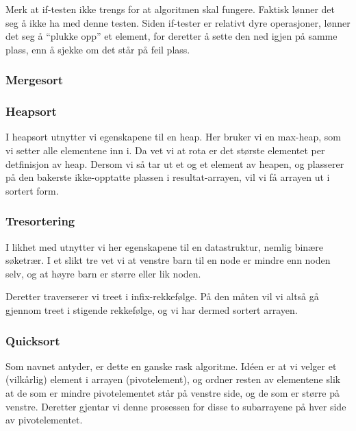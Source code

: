 Merk at if-testen ikke trengs for at algoritmen skal fungere.
Faktisk lønner det seg å ikke ha med denne testen.
Siden if-tester er relativt dyre operasjoner, lønner det seg å ``plukke opp'' et
element, for deretter å sette den ned igjen på samme plass, enn å sjekke om det
står på feil plass.


\subsubsection{\color{red}Mergesort}\label{mergesort}

\subsubsection{\color{red}Heapsort}\label{heapsort}
I heapsort utnytter vi egenskapene til en heap.
Her bruker vi en max-heap, som vi setter alle elementene inn i. Da vet vi at
rota er det største elementet per detfinisjon av heap. Dersom vi så tar ut et og
et element av heapen, og plasserer på den bakerste ikke-opptatte plassen i
resultat-arrayen, vil vi få arrayen ut i sortert form.

\subsubsection{\color{red}Tresortering}\label{treesort}
I likhet med  utnytter vi her egenskapene til en datastruktur,
nemlig binære søketrær. I et slikt tre vet vi at venstre barn til en node er
mindre enn noden selv, og at høyre barn er større eller lik noden.

Deretter traverserer vi treet i infix-rekkefølge. På den måten vil vi altså gå
gjennom treet i stigende rekkefølge, og vi har dermed sortert arrayen.

\subsubsection{\color{red}Quicksort}
\label{quick}
Som navnet antyder, er dette en ganske rask algoritme.
Idéen er at vi velger et (vilkårlig) element i arrayen (pivotelement), og ordner resten av
elementene slik at de som er mindre pivotelementet står på venstre side, og de
som er større på venstre. Deretter gjentar vi denne prosessen for disse to
subarrayene på hver side av pivotelementet.


